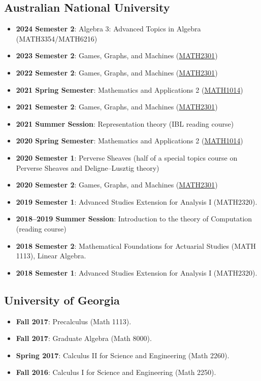 \documentclass[a4paper]{moderncv}
\begin{document}
\subsection*{Australian National University}
\label{sec:orgeccafd4}
\begin{itemize}
\item \textbf{2024 Semester 2}: Algebra 3: Advanced Topics in Algebra (MATH3354/MATH6216)
\item \textbf{2023 Semester 2}: Games, Graphs, and Machines (\href{https://asilata.github.io/ggm/}{MATH2301})
\item \textbf{2022 Semester 2}: Games, Graphs, and Machines (\href{https://asilata.github.io/ggm/}{MATH2301})
\item \textbf{2021 Spring Semester}: Mathematics and Applications 2 (\href{https://programsandcourses.anu.edu.au/course/MATH1014}{MATH1014})
\item \textbf{2021 Semester 2}: Games, Graphs, and Machines (\href{https://asilata.github.io/ggm/}{MATH2301})
\item \textbf{2021 Summer Session}: Representation theory (IBL reading course)
\item \textbf{2020 Spring Semester}: Mathematics and Applications 2 (\href{https://programsandcourses.anu.edu.au/course/MATH1014}{MATH1014})
\item \textbf{2020 Semester 1}: Perverse Sheaves (half of a special topics course on Perverse Sheaves and Deligne--Lusztig theory)
\item \textbf{2020 Semester 2}: Games, Graphs, and Machines (\href{https://asilata.github.io/ggm/}{MATH2301})
\item \textbf{2019 Semester 1}: Advanced Studies Extension for Analysis I (MATH2320).
\item \textbf{2018–2019 Summer Session}: Introduction to the theory of Computation (reading course)
\item \textbf{2018 Semester 2}: Mathematical Foundations for Actuarial Studies (MATH 1113), Linear Algebra.
\item \textbf{2018 Semester 1}: Advanced Studies Extension for Analysis I (MATH2320).
\end{itemize}


\subsection*{University of Georgia}
\label{sec:org2d785d5}
\begin{itemize}
\item \textbf{Fall 2017}: Precalculus (Math 1113).
\item \textbf{Fall 2017}: Graduate Algebra (Math 8000).
\item \textbf{Spring 2017}: Calculus II for Science and Engineering (Math 2260).
\item \textbf{Fall 2016}: Calculus I for Science and Engineering (Math 2250).
\end{itemize}
\end{document}
